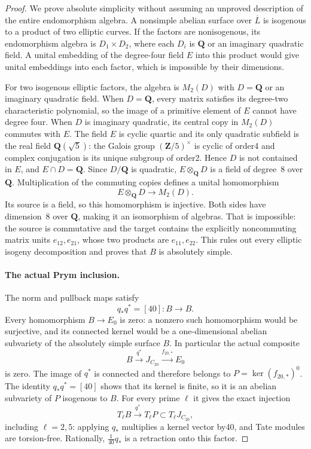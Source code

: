 \begin{proof}
We prove absolute simplicity without assuming an unproved description
of the entire endomorphism algebra. A nonsimple abelian surface over
$\overline L$ is isogenous to a product of two elliptic curves.
If the factors are nonisogenous, its endomorphism algebra is
$D_1\times D_2$, where each $D_i$ is $\mathbf Q$ or an imaginary
quadratic field. A unital embedding of the degree-four field $E$ into
this product would give unital embeddings into each factor, which is
impossible by their dimensions.

For two isogenous elliptic factors, the algebra is $M_2(D)$ with
$D=\mathbf Q$ or an imaginary quadratic field. When $D=\mathbf Q$,
every matrix satisfies its degree-two characteristic polynomial, so
the image of a primitive element of $E$ cannot have degree four.
When $D$ is imaginary quadratic, its central copy in $M_2(D)$ commutes
with $E$. The field $E$ is cyclic quartic and its only quadratic
subfield is the real field $\mathbf Q(\sqrt5)$: the Galois group
$(\mathbf Z/5)^\times$ is cyclic of order4 and complex conjugation
is its unique subgroup of order2. Hence $D$ is not contained in $E$,
and $E\cap D=\mathbf Q$. Since $D/\mathbf Q$ is quadratic,
$E\otimes_{\mathbf Q}D$ is a field of degree~8 over $\mathbf Q$.
Multiplication of the commuting copies defines a unital homomorphism
\[
 E\otimes_{\mathbf Q}D\longrightarrow M_2(D).
\]
Its source is a field, so this homomorphism is injective. Both sides
have dimension~8 over $\mathbf Q$, making it an isomorphism of
algebras. That is impossible: the source is commutative and the
target contains the explicitly noncommuting matrix units
$e_{12},e_{21}$, whose two products are $e_{11},e_{22}$.
This rules out every elliptic isogeny decomposition and proves that
$B$ is absolutely simple.

\paragraph{The actual Prym inclusion.}
The norm and pullback maps satisfy
\[
 q_*q^*=[40]:B\to B.
\]
Every homomorphism $B\to E_0$ is zero: a nonzero such homomorphism
would be surjective, and its connected kernel would be a
one-dimensional abelian subvariety of the absolutely simple surface
$B$. In particular the actual composite
\[
 B\xrightarrow{q^*}J_{C_{20}}\xrightarrow{f_{20,*}}E_0
\]
is zero. The image of $q^*$ is connected and therefore belongs to
$P=\ker(f_{20,*})^0$. The identity $q_*q^*=[40]$ shows that its kernel
is finite, so it is an abelian subvariety of $P$ isogenous to $B$.
For every prime $\ell$ it gives the exact injection
\[
 T_\ell B\xrightarrow{q^*}T_\ell P\subset T_\ell J_{C_{20}},
\]
including $\ell=2,5$: applying $q_*$ multiplies a kernel vector by40,
and Tate modules are torsion-free. Rationally, $\tfrac1{40}q_*$ is a
retraction onto this factor.


\end{proof}
